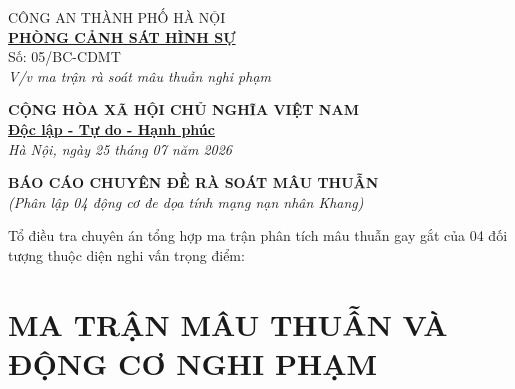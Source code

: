 \documentclass[12pt,a4paper]{article}
\begin{document}
\noindent
\begin{minipage}[t]{0.45\textwidth}
    \begin{center}
        \small
        CÔNG AN THÀNH PHỐ HÀ NỘI\\
        \textbf{\underline{PHÒNG CẢNH SÁT HÌNH SỰ}}\\[0.1cm]
        Số: 05/BC-CDMT\\
        \textit{V/v ma trận rà soát mâu thuẫn nghi phạm}
    \end{center}
\end{minipage}
\hfill
\begin{minipage}[t]{0.52\textwidth}
    \begin{center}
        \small
        \textbf{CỘNG HÒA XÃ HỘI CHỦ NGHĨA VIỆT NAM}\\
        \textbf{\underline{Độc lập - Tự do - Hạnh phúc}}\\[0.1cm]
        \textit{Hà Nội, ngày 25 tháng 07 năm 2026}
    \end{center}
\end{minipage}

\vspace{0.6cm}

\begin{center}
    \textbf{\large BÁO CÁO CHUYÊN ĐỀ RÀ SOÁT MÂU THUẪN}\\
    \textit{(Phân lập 04 động cơ đe dọa tính mạng nạn nhân Khang)}
\end{center}

\vspace{0.3cm}

\noindent Tổ điều tra chuyên án tổng hợp ma trận phân tích mâu thuẫn gay gắt của 04 đối tượng thuộc diện nghi vấn trọng điểm:

\section*{MA TRẬN MÂU THUẪN VÀ ĐỘNG CƠ NGHI PHẠM}
\end{document}
